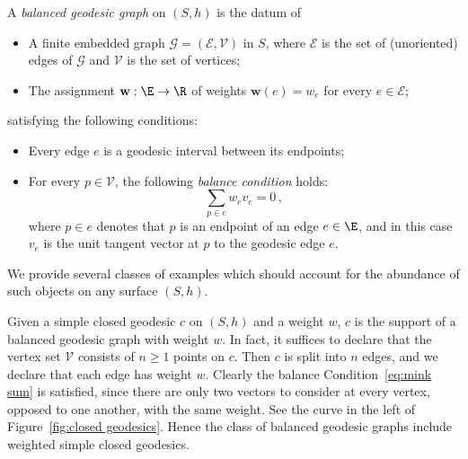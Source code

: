 \begin{defi}\label{defi geod graph}
A \emph{balanced geodesic graph} on $(S,h)$ is the datum of
\begin{itemize}
\item A finite embedded graph $\mathcal{G}=(\mathcal E,\mathcal V)$ in $S$, where $\mathcal E$ is the set of (unoriented) edges of $\mathcal{G}$ and $\mathcal V$ is the set of vertices;
\item The assignment $\mathbf w:\E\to\R$ of weights $\mathbf w(e)=w_e$ for every $e\in\mathcal E$;
\end{itemize}
satisfying the following conditions:
\begin{itemize}
\item Every edge $e$ is a geodesic interval between its endpoints;
\item For every $p\in\mathcal V$, the following \emph{balance condition} holds:
\begin{equation}\label{eq:mink sum}
{\sum_{p\in e} w_{e} v_{e}}=0\,,
\end{equation}
where $p\in e$ denotes that $p$ is an endpoint of an edge $e\in \E$, and in this case $v_{e}$ is the unit tangent vector at $p$ to the geodesic edge $e$.
\end{itemize}
\end{defi}

We provide several classes of examples which should account for the abundance of such objects on any surface $(S,h)$.

\begin{exam}\label{example simple closed geo}
Given a simple closed geodesic $c$ on $(S,h)$ and a weight $w$, $c$ is the support of a balanced geodesic graph with weight $w$. In fact, it suffices to declare that the vertex set $\mathcal V$ consists of $n\geq 1$ points on $c$. Then $c$ is split into $n$ edges, and we declare that each edge has weight $w$. Clearly the balance Condition~\eqref{eq:mink sum} is satisfied, since there are only two vectors to consider at every vertex, opposed to one another, with the same weight. See the curve in the left of Figure~\ref{fig:closed geodesics}. Hence the class of balanced geodesic graphs include weighted simple closed geodesics.
\end{exam}

